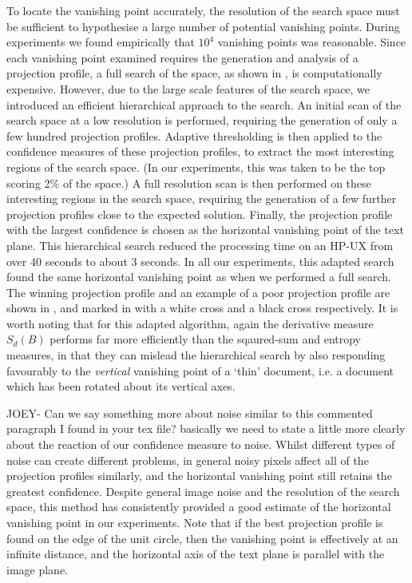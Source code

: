To locate the vanishing point accurately, the resolution of the
search space must be sufficient to hypothesise a large number of potential
vanishing points.  During experiments we found empirically that $10^4$
vanishing points was reasonable. Since each vanishing point examined requires
the generation and analysis of a projection profile, a full search of the
space, as shown in , is computationally expensive.  However, due
to the large scale features of the search space, we introduced an efficient
hierarchical approach to the search.  An initial scan of the search space at a
low resolution is performed, requiring the generation of only a few hundred
projection profiles.  Adaptive thresholding is then applied to the confidence
measures of these projection profiles, to extract the most interesting regions
of the search space.  (In our experiments, this was taken to be the top scoring
2\% of the space.) A full resolution scan is then performed on these
interesting regions in the search space, requiring the generation of a few
further projection profiles close to the expected solution.  Finally, the
projection profile with the largest confidence is chosen as the horizontal
vanishing point of the text plane.  
This hierarchical search reduced the processing time on an HP-UX from over 40
seconds to about 3 seconds. In all our experiments, this adapted search found
the same horizontal vanishing point as when we performed a full search.
The winning projection profile and an
example of a poor projection profile are shown in , and
marked in  with a white cross and a black cross respectively.
It is worth noting that for this adapted algorithm, again the derivative measure
$S_d(B)$ performs far more efficiently than the sqaured-sum and entropy
measures, in that they can mislead the hierarchical search by also responding
favourably to the {\em vertical} vanishing point of a `thin' document, i.e. a
document which has been rotated about its vertical axes. 


JOEY- Can we say something more about noise similar to this commented 
paragraph I found in your tex file? basically we need to state a little more
clearly about the reaction of our confidence measure to noise.
Whilst different types of noise can create different problems,
in general noisy pixels affect all of the projection profiles similarly,
and the horizontal vanishing point still retains the greatest confidence.
Despite general image noise and the resolution of the search space, this method 
has consistently provided a good estimate of the 
horizontal vanishing point in our experiments.
Note that if the best projection profile is found on the edge of the unit
circle, then the vanishing point is effectively at an infinite distance, and the
horizontal axis of the text plane is parallel with the image plane.

